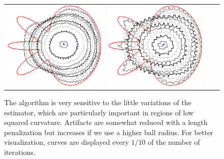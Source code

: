 \begin{figure}
\begin{tabular}{p{2.5em}ccc}
\includegraphics[scale=0.24]{figures/chapter6/radius-effect/flower/improve/len_pen0.5/radius-5/summary.pdf} &
\includegraphics[scale=0.24]{figures/chapter6/radius-effect/flower/improve/len_pen0.5/radius-9/summary.pdf}
\end{tabular}

\caption{The algorithm is very sensitive to the little variations of the estimator, which are particularly important in regions of low squared curvature. Artifacts are somewhat reduced with a length penalization but increases if we use a higher ball radius. For better visualization, curves are displayed every $1/10$ of the number of iterations. }
\label{fig:m1-square-flow}
\end{figure}



